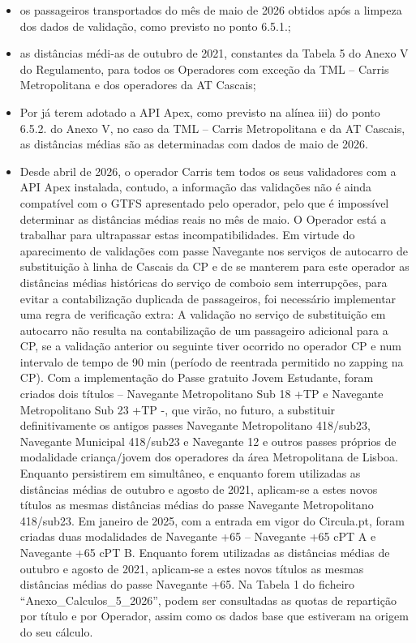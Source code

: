 \documentclass[
  a4paper,
]{article}
\providecommand{\tightlist}{%
  \setlength{\itemsep}{0pt}\setlength{\parskip}{0pt}}
\begin{document}
\begin{itemize}
\tightlist
\item
  os passageiros transportados do mês de maio de 2026 obtidos após a
  limpeza dos dados de validação, como previsto no ponto 6.5.1.;
\item
  as distâncias médi-as de outubro de 2021, constantes da Tabela 5 do
  Anexo V do Regulamento, para todos os Operadores com exceção da TML --
  Carris Metropolitana e dos operadores da AT Cascais;
\item
  Por já terem adotado a API Apex, como previsto na alínea iii) do ponto
  6.5.2. do Anexo V, no caso da TML -- Carris Metropolitana e da AT
  Cascais, as distâncias médias são as determinadas com dados de maio de
  2026.
\item
  Desde abril de 2026, o operador Carris tem todos os seus validadores
  com a API Apex instalada, contudo, a informação das validações não é
  ainda compatível com o GTFS apresentado pelo operador, pelo que é
  impossível determinar as distâncias médias reais no mês de maio. O
  Operador está a trabalhar para ultrapassar estas incompatibilidades.
  Em virtude do aparecimento de validações com passe Navegante nos
  serviços de autocarro de substituição à linha de Cascais da CP e de se
  manterem para este operador as distâncias médias históricas do serviço
  de comboio sem interrupções, para evitar a contabilização duplicada de
  passageiros, foi necessário implementar uma regra de verificação
  extra: A validação no serviço de substituição em autocarro não resulta
  na contabilização de um passageiro adicional para a CP, se a validação
  anterior ou seguinte tiver ocorrido no operador CP e num intervalo de
  tempo de 90 min (período de reentrada permitido no zapping na CP). Com
  a implementação do Passe gratuito Jovem Estudante, foram criados dois
  títulos -- Navegante Metropolitano Sub 18 +TP e Navegante
  Metropolitano Sub 23 +TP -, que virão, no futuro, a substituir
  definitivamente os antigos passes Navegante Metropolitano 418/sub23,
  Navegante Municipal 418/sub23 e Navegante 12 e outros passes próprios
  de modalidade criança/jovem dos operadores da área Metropolitana de
  Lisboa. Enquanto persistirem em simultâneo, e enquanto forem
  utilizadas as distâncias médias de outubro e agosto de 2021,
  aplicam-se a estes novos títulos as mesmas distâncias médias do passe
  Navegante Metropolitano 418/sub23. Em janeiro de 2025, com a entrada
  em vigor do Circula.pt, foram criadas duas modalidades de Navegante
  +65 -- Navegante +65 cPT A e Navegante +65 cPT B. Enquanto forem
  utilizadas as distâncias médias de outubro e agosto de 2021,
  aplicam-se a estes novos títulos as mesmas distâncias médias do passe
  Navegante +65. Na Tabela 1 do ficheiro ``Anexo\_Calculos\_5\_2026'',
  podem ser consultadas as quotas de repartição por título e por
  Operador, assim como os dados base que estiveram na origem do seu
  cálculo.
\end{itemize}
\end{document}
